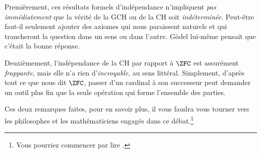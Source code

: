 \documentclass[../../../include/open-logic-section]{subfiles}
\begin{document}
Premièrement, ces résultats formels
d'indépendance n'impliquent \emph{pas
immédiatement} que la vérité de la GCH
ou de la CH soit \emph{indéterminée}.
Peut-être faut-il seulement ajouter des
axiomes qui nous paraissent naturels et
qui trancheront la question dans un sens
ou dans l'autre. Gödel lui-même pensait
que c'était la bonne réponse.

Deuxièmement, l'indépendance de la CH
par rapport à $\ZFC$ est assurément
\emph{frappante}, mais elle n'a rien
d'\emph{incroyable}, au sens littéral.
Simplement, d'après tout ce que nous dit
$\ZFC$, passer d'un cardinal à son
successeur peut demander un outil plus
fin que la seule opération qui forme
l'ensemble des parties.

Ces deux remarques faites, pour en savoir
plus, il vous faudra vous tourner vers les
philosophes et les mathématiciens engagés
dans ce débat.\footnote{Vous pourriez
commencer par lire \citet[\S15.6]{Potter2004}.}
\end{document}
